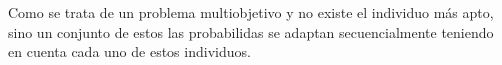 Como se trata de un problema multiobjetivo y no existe el individuo m\'as apto, sino un conjunto de estos las probabilidas se adaptan secuencialmente teniendo en cuenta cada uno de estos individuos.
